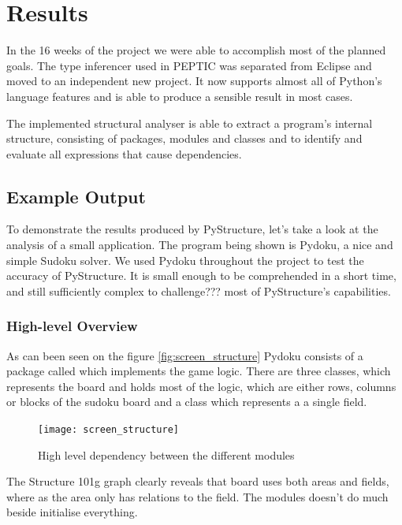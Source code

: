 \documentclass[12pt,halfparskip,DIV11,BCOR10mm]{scrreprt}
\begin{document}
\chapter{Results}

In the 16 weeks of the project we were able to accomplish most of the planned goals. The type inferencer used in PEPTIC\cite{peptic2} was separated from Eclipse and moved to an independent new project. It now supports almost all of Python's language features and is able to produce a sensible result in most cases.

The implemented structural analyser is able to extract a program's internal structure, consisting of packages, modules and classes and to identify and evaluate all expressions that cause dependencies.

\section{Example Output}

To demonstrate the results produced by PyStructure, let's take a look at the analysis of a small application. The program being shown is Pydoku, a nice and simple Sudoku solver. We used Pydoku throughout the project to test the accuracy of PyStructure. It is small enough to be comprehended in a short time, and still sufficiently complex to challenge??? most of PyStructure's capabilities.

\subsection{High-level Overview}

As can been seen on the figure \vref{fig:screen_structure} Pydoku consists of a package called  which implements the game logic. There are three classes,  which represents the board and holds most of the logic,  which are either rows, columns or blocks of the sudoku board and a class  which represents a a single field.

\begin{figure}[H]
    \centering
    \texttt{[image: screen\_structure]}
    \caption{High level dependency between the different modules}
    \label{fig:screen_structure}
\end{figure}

The Structure 101g graph clearly reveals that board uses both areas and fields, where as the area only has relations to the field. The  modules doesn't do much beside initialise everything. 
\end{document}
